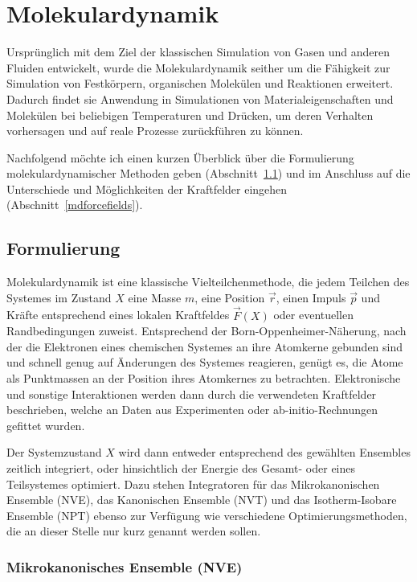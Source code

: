 \section{Molekulardynamik}
\label{md}

Ursprünglich mit dem Ziel der klassischen Simulation von Gasen und anderen Fluiden entwickelt, wurde die Molekulardynamik\cite{hoover_molecular_1986} seither um die Fähigkeit zur Simulation von Festkörpern, organischen Molekülen und Reaktionen erweitert.
Dadurch findet sie Anwendung in Simulationen von Materialeigenschaften und Molekülen bei beliebigen Temperaturen und Drücken, um deren Verhalten vorhersagen und auf reale Prozesse zurückführen zu können.

Nachfolgend möchte ich einen kurzen Überblick über die Formulierung molekulardynamischer Methoden geben (Abschnitt~\ref{mdformulation}) und im Anschluss auf die Unterschiede und Möglichkeiten der Kraftfelder eingehen (Abschnitt~\ref{mdforcefields}).

\subsection{Formulierung}
\label{mdformulation}

Molekulardynamik ist eine klassische Vielteilchenmethode, die jedem Teilchen des Systemes im Zustand $X$ eine Masse $m$, eine Position $\vec r$, einen Impuls $\vec p$ und Kräfte entsprechend eines lokalen Kraftfeldes $\vec{F}(X)$ oder eventuellen Randbedingungen zuweist.
Entsprechend der Born-Oppenheimer-Näherung, nach der die Elektronen eines chemischen Systemes an ihre Atomkerne gebunden sind und schnell genug auf Änderungen des Systemes reagieren, genügt es, die Atome als Punktmassen an der Position ihres Atomkernes zu betrachten.
Elektronische und sonstige Interaktionen werden dann durch die verwendeten Kraftfelder beschrieben, welche an Daten aus Experimenten oder ab-initio-Rechnungen gefittet wurden.

Der Systemzustand $X$ wird dann entweder entsprechend des gewählten Ensembles zeitlich integriert, oder hinsichtlich der Energie des Gesamt- oder eines Teilsystemes optimiert.
Dazu stehen Integratoren für das Mikrokanonischen Ensemble (NVE), das Kanonischen Ensemble (NVT) und das Isotherm-Isobare Ensemble (NPT) ebenso zur Verfügung wie verschiedene Optimierungsmethoden, die an dieser Stelle nur kurz genannt werden sollen.

\subsubsection{Mikrokanonisches Ensemble (NVE)}

